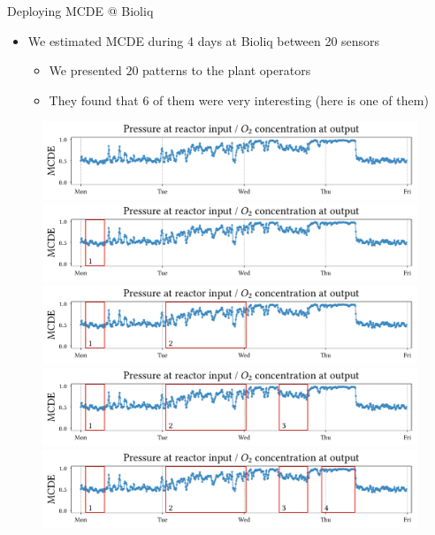 \documentclass[16pt,usenames,dvipsnames, notheorems]{beamer}
\theoremstyle{definition}
\theoremstyle{example}
\theoremstyle{plain}
\begin{document}
\begin{frame}{Deploying MCDE @ Bioliq}

\begin{itemize}
	\item We estimated MCDE during 4 days at Bioliq between 20 sensors
	\pause
	\begin{itemize}
		\item We presented $20$ patterns to the plant operators 
		\pause
		\item They found that $6$ of them were very interesting (here is one of them)
	\end{itemize}
\end{itemize}

\begin{figure}
	\centering
	\begin{overprint}
		 \includegraphics[width=0.95\linewidth]{figures/Dep_example_thesis_2_0-compressed.pdf}
		\onslide<4> \includegraphics[width=0.95\linewidth]{figures/Dep_example_thesis_2_1-compressed.pdf}
		\onslide<5> \includegraphics[width=0.95\linewidth]{figures/Dep_example_thesis_2_2-compressed.pdf}
		\onslide<6> \includegraphics[width=0.95\linewidth]{figures/Dep_example_thesis_2_3-compressed.pdf}
		\onslide<7-> \includegraphics[width=0.95\linewidth]{figures/Dep_example_thesis_2_4-compressed.pdf}

\end{overprint}
\end{figure}
\end{frame}
\end{document}
